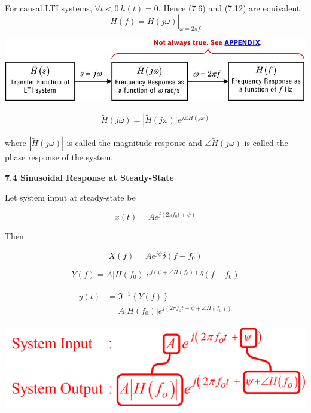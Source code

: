 \documentclass[landscape,a4paper]{extarticle}
\newenvironment{Figure}
  {\par\medskip\noindent\minipage{\linewidth}}
  {\endminipage\par\medskip}
\newcommand{\invfourier}[1]{\Im^{-1}\left\{#1\right\}}
\begin{document}
\begin{multicols*}{5}
    For causal LTI systems, $\forall t < 0\ h(t) = 0$. Hence (7.6) and (7.12) are equivalent.
    \[
        H(f) = \left.\tilde{H}(j \omega)\right|_{\omega=2\pi f} \tag{7.13}
    \]

    \begin{Figure}
        \centering
        \includegraphics[width=\linewidth]{transferFunc_freqResponse.jpg}        
    \end{Figure}

    \[
        \tilde{H}(j\omega) = |\tilde{H}(j\omega)|e^{j\angle \tilde{H}(j \omega)} \tag{7.14}
    \]

    where $|\tilde{H}(j \omega)|$ is called the magnitude response
    and $\angle \tilde{H}(j \omega)$ is called the phase response of the system.

    \textbf{7.4 Sinusoidal Response at Steady-State}

    Let system input at steady-state be 
    
    \[
        x(t) = Ae^{j (2\pi f_0t + \psi)} \tag{7.15}
    \]

    Then

    \[
        X(f) = Ae^{j\psi}\delta (f-f_0) \tag{7.16}
    \]

    \[
        Y(f) = A \left|H(f_0)\right|e^{j(\psi + \angle H(f_0))}\delta(f-f_0) \tag{7.17}
    \]

    \begin{align*}
        \begin{split}
            y(t) &= \invfourier{Y(f)}\\
            &= A \left|H(f_0)\right|e^{j(2\pi f_0 t + \psi + \angle H(f_0))} 
        \end{split} \tag{7.18}
    \end{align*}

    \begin{Figure}
        \includegraphics[width=0.8\linewidth]{sinusoidalResponseComparison.png}        
    \end{Figure}


\end{multicols*}
\end{document}

